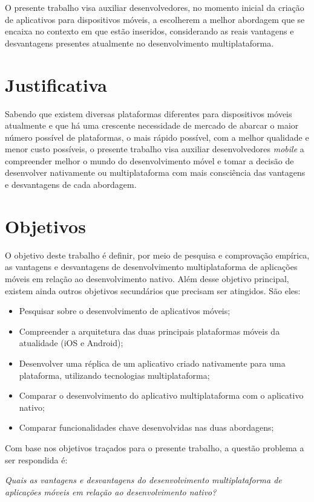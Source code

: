 O presente trabalho visa auxiliar desenvolvedores, no momento inicial da criação de aplicativos 
para dispositivos móveis, a escolherem a melhor abordagem que se encaixa no contexto em que estão inseridos,
considerando as reais vantagens e desvantagens presentes atualmente no desenvolvimento multiplataforma.

\section{Justificativa}\label{sec:justificativa}

Sabendo que existem diversas plataformas diferentes para dispositivos móveis atualmente e que há uma crescente 
necessidade de mercado de abarcar o maior número possível de plataformas, o mais rápido possível, com a
melhor qualidade e menor custo possíveis, o presente trabalho visa auxiliar desenvolvedores \textit{mobile} 
a compreender melhor o mundo do desenvolvimento móvel e tomar a decisão de 
desenvolver nativamente ou multiplataforma com mais consciência das vantagens e desvantagens de cada abordagem.

\section{Objetivos} \label{sec:objetivos}

O objetivo deste trabalho é definir, por meio de pesquisa e comprovação empírica, as vantagens e desvantagens de desenvolvimento multiplataforma de aplicações móveis em relação ao desenvolvimento nativo. 
Além desse objetivo principal, existem ainda outros objetivos secundários que precisam ser atingidos. São eles: 
\begin{itemize}
    \item Pesquisar sobre o desenvolvimento de aplicativos móveis;
    \item Compreender a arquitetura das duas principais plataformas móveis da atualidade (iOS e Android);
    \item Desenvolver uma réplica de um aplicativo criado nativamente para uma plataforma, utilizando tecnologias multiplataforma;
    \item Comparar o desenvolvimento do aplicativo multiplataforma com o aplicativo nativo;
    \item Comparar funcionalidades chave desenvolvidas nas duas abordagens;
\end{itemize}
Com base nos objetivos traçados para o presente trabalho, a questão problema a ser respondida é:
\begin{center}
    \textit{Quais as vantagens e desvantagens do desenvolvimento multiplataforma de aplicações móveis em relação ao desenvolvimento nativo?}
\end{center}

